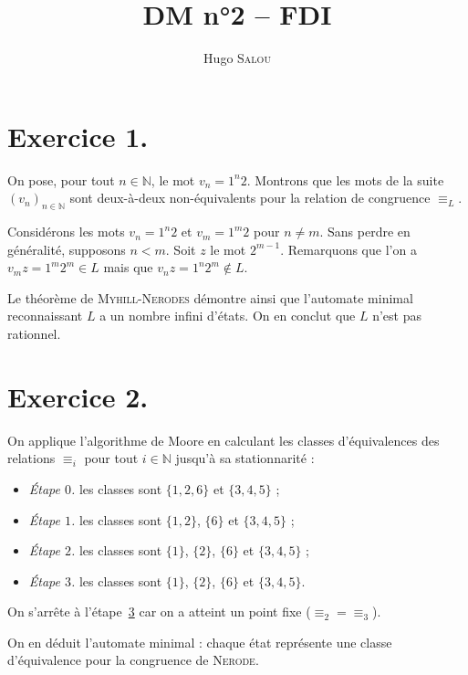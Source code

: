 \documentclass{../../notes}
\title{DM n°2 -- FDI}
\author{Hugo \scshape Salou}
\begin{document}
  \maketitle
  \chapter*{Exercice 1.}

  On pose, pour tout $n \in \mathds{N}$, le mot $v_n = 1^n 2$.
  Montrons que les mots de la suite $(v_n)_{n \in \mathds{N}}$ sont deux-à-deux non-équivalents pour la relation de congruence $\equiv_L$.

  Considérons les mots $v_n = 1^n 2$ et $v_m = 1^m 2$ pour $n \neq m$.
  Sans perdre en généralité, supposons $n < m$.
  Soit $z$ le mot $2^{m-1}$.
  Remarquons que l'on a  $v_m z = 1^m 2^m \in L$ mais que $v_n z = 1^n 2^m \not\in L$.

  Le théorème de \textsc{Myhill-Nerodes} démontre ainsi que l'automate minimal reconnaissant $L$ a un nombre infini d'états.
  On en conclut que $L$ n'est pas rationnel.

  \chapter*{Exercice 2.}

  On applique l'algorithme de Moore en calculant les classes d'équivalences des relations $\equiv_i$ pour tout $i \in \mathds{N}$ jusqu'à sa stationnarité :
  \begin{itemize}
    \item \textsl{\color{deepblue} Étape $0$.} les classes sont $\{1,2,6\}$ et $\{3,4,5\}$ ;\label{ex2-step0}
    \item \textsl{\color{deepblue} Étape $1$.} les classes sont $\{1,2\}$, $\{6\}$ et $\{3,4,5\}$ ;\label{ex2-step1}
    \item \textsl{\color{deepblue} Étape $2$.} les classes sont $\{1\}$, $\{2\}$, $\{6\}$ et $\{3,4,5\}$ ;\label{ex2-step2}
    \item \textsl{\color{deepblue} Étape $3$.} les classes sont $\{1\}$, $\{2\}$, $\{6\}$ et $\{3,4,5\}$.\label{ex2-step3}
  \end{itemize}
  On s'arrête à l'étape~\hyperref[ex2-step3]{3} car on a atteint un point fixe (${\equiv_{\hyperref[ex2-step2]{2}}} = {\equiv_{\hyperref[ex2-step3]{3}}}$).

  On en déduit l'automate minimal : chaque état représente une classe d'équivalence pour la congruence de \textsc{Nerode}.
\end{document}

